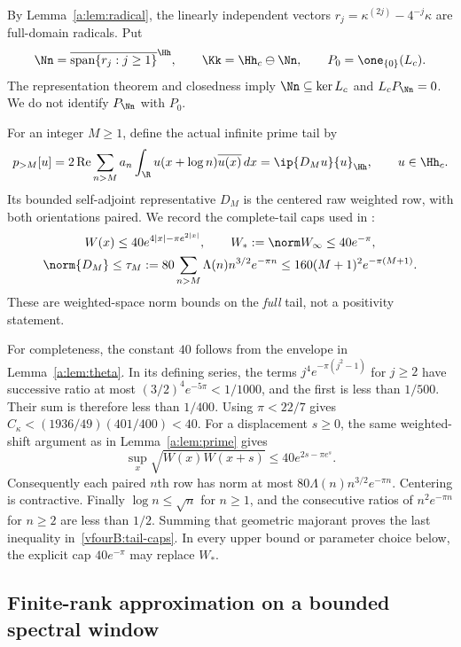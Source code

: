 By Lemma~\ref{a:lem:radical}, the linearly independent vectors
$r_j=\kappa^{(2j)}-4^{-j}\kappa$ are full-domain radicals. Put
\begin{equation}\label{vfourB:known-radical}
 \Nn=\overline{\operatorname{span}\{r_j:j\ge1\}}^{\Hh},
 \qquad \Kk=\Hh_c\ominus\Nn,
 \qquad P_0=\one_{\{0\}}(L_c).
\end{equation}
The representation theorem and closedness imply
$\Nn\subseteq\ker L_c$ and $L_cP_\Nn=0$. We do not identify
$P_\Nn$ with $P_0$.

For an integer $M\ge1$, define the actual infinite prime tail by
\begin{equation}\label{vfourB:tail-form}
 p_{>M}[u]=2\operatorname{Re}\sum_{n>M}
 a_n\int_{\R}u(x+\log n)\overline{u(x)}\,dx
 =\ip{D_Mu}{u}_{\Hh},\qquad u\in\Hh_c.
\end{equation}
Its bounded self-adjoint representative $D_M$ is the centered raw weighted
row, with both orientations paired. We record the complete-tail caps used
in \cite{vfourLowWindow}:
\begin{equation}\label{vfourB:tail-caps}
 \begin{gathered}
 W(x)\le40e^{4|x|-\pi e^{2|x|}},\qquad
 W_*:=\norm W_\infty\le40e^{-\pi},\\
 \norm{D_M}\le\tau_M:=80\sum_{n>M}\Lambda(n)n^{3/2}e^{-\pi n}
 \le160(M+1)^2e^{-\pi(M+1)}.
 \end{gathered}
\end{equation}
These are weighted-space norm bounds on the \emph{full} tail, not a
positivity statement.

For completeness, the constant $40$ follows from the envelope in
Lemma~\ref{a:lem:theta}. In its defining series, the terms
$j^4e^{-\pi(j^2-1)}$ for $j\ge2$ have successive ratio at most
$(3/2)^4e^{-5\pi}<1/1000$, and the first is less than $1/500$.
Their sum is therefore less than $1/400$. Using $\pi<22/7$ gives
$C_\kappa<(1936/49)(401/400)<40$.
For a displacement $s\ge0$, the same weighted-shift argument as in
Lemma~\ref{a:lem:prime} gives
\[
 \sup_x\sqrt{W(x)W(x+s)}\le40e^{2s-\pi e^s}.
\]
Consequently each paired $n$th row has norm at most
$80\Lambda(n)n^{3/2}e^{-\pi n}$. Centering is contractive.
Finally $\log n\le\sqrt n$ for $n\ge1$, and the consecutive ratios of
$n^2e^{-\pi n}$ for $n\ge2$ are less than $1/2$. Summing that geometric
majorant proves the last inequality in~\eqref{vfourB:tail-caps}.
In every upper bound or parameter choice below, the explicit cap
$40e^{-\pi}$ may replace $W_*$.

\subsection{Finite-rank approximation on a bounded spectral window}
\label{vfourB:approximation}

